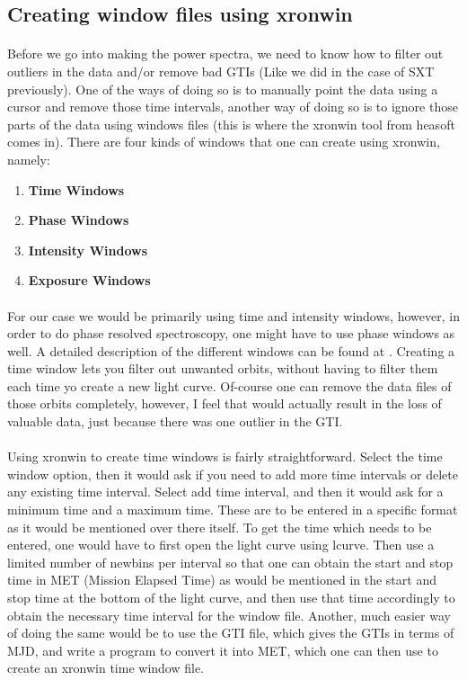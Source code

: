 \documentclass[a4paper,twoside]{report}
\numberwithin{equation}{section}
\begin{document}
\subsection{Creating window files using xronwin}
\paragraph{}
Before we go into making the power spectra, we need to know how to filter out outliers in the data and/or remove bad GTIs (Like we did in the case of SXT previously). One of the ways of doing so is to manually point the data using a cursor and remove those time intervals, another way of doing so is to ignore those parts of the data using windows files (this is where the xronwin tool from heasoft comes in). There are four kinds of windows that one can create using xronwin, namely:
\begin{enumerate}
    \item \textbf{Time Windows}
    \item \textbf{Phase Windows}
    \item \textbf{Intensity Windows}
    \item \textbf{Exposure Windows}
\end{enumerate}
\paragraph{}
For our case we would be primarily using time and intensity windows, however, in order to do phase resolved spectroscopy, one might have to use phase windows as well. A detailed description of the different windows can be found at \cite{xronwin1}. Creating a time window lets you filter out unwanted orbits, without having to filter them each time yo create a new light curve. Of-course one can remove the data files of those orbits completely, however, I feel that would actually result in the loss of valuable data, just because there was one outlier in the GTI. 
\paragraph{}
Using xronwin to create time windows is fairly straightforward. Select the time window option, then it would ask if you need to add more time intervals or delete any existing time interval. Select add time interval, and then it would ask for a minimum time and a maximum time. These are to be entered in a specific format as it would be mentioned over there itself. To get the time which needs to be entered, one would have to first open the light curve using lcurve. Then use a limited number of newbins per interval so that one can obtain the start and stop time in MET (Mission Elapsed Time) as would be mentioned in the start and stop time at the bottom of the light curve, and then use that time accordingly to obtain the necessary time interval for the window file. Another, much easier way of doing the same would be to use the GTI file, which gives the GTIs in terms of MJD, and write a program to convert it into MET, which one can then use to create an xronwin time window file. 
\end{document}
